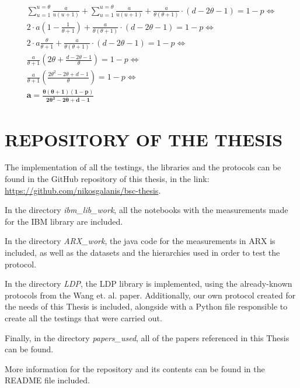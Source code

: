 \documentclass[inscr]{dithesis}
\begin{document}
\begin{appendix}
\begin{align*}
    \sum_{u = 1}^{u = \theta} \frac{a}{u (u + 1)} + \sum_{u = 1}^{u = \theta} \frac{a}{u (u + 1)} + \frac{a}{\theta(\theta+1)} \cdot (d - 2\theta - 1) = 1 - p \Longleftrightarrow\\
    2 \cdot a (1 - \frac{1}{\theta + 1}) + \frac{a}{\theta(\theta+1)} \cdot (d - 2\theta - 1) = 1 - p \Longleftrightarrow\\
    2 \cdot a \frac{\theta}{\theta + 1} + \frac{a}{\theta(\theta+1)} \cdot (d - 2\theta - 1) = 1 - p \Longleftrightarrow\\
    \frac{a}{\theta + 1}(2 \theta + \frac{d - 2\theta - 1}{\theta}) = 1 - p \Longleftrightarrow \\ 
    \frac{a}{\theta + 1}(\frac{2\theta^2 - 2\theta + d - 1}{\theta}) = 1 - p \Longleftrightarrow \\ 
    \mathbf{a = \frac{\theta(\theta + 1) (1 - p)}{2\theta^2 - 2\theta + d - 1}}
\end{align*}

\chapter{REPOSITORY OF THE THESIS}
The implementation of all the testings, the libraries and the protocols can be found in the GitHub repository of this thesis, in the link: \url{https://github.com/nikosgalanis/bsc-thesis}. 

In the directory \textit{ibm\_lib\_work}, all the notebooks with the measurements made for the IBM library are included.

In the directory \textit{ARX\_work}, the java code for the measurements in ARX is included, as well as the datasets and the hierarchies used in order to test the protocol.

In the directory \textit{LDP}, the LDP library is implemented, using the already-known protocols from the Wang et. al. paper. Additionally, our own protocol created for the needs of this Thesis is included, alongside with a Python file responsible to create all the testings that were carried out.

Finally, in the directory \textit{papers\_used}, all of the papers referenced in this Thesis can be found. 


More information for the repository and its contents can be found in the README file included.

\end{appendix}


\end{document}
